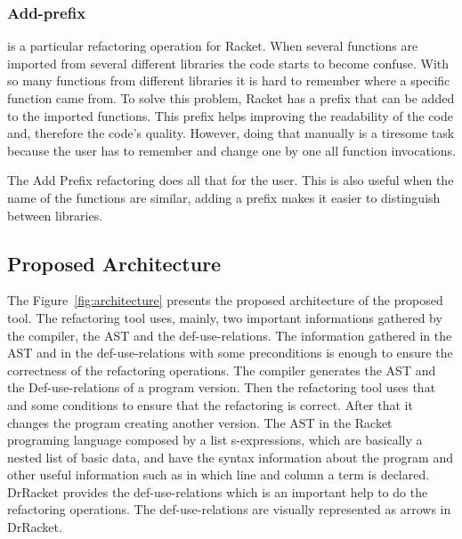 \subsubsection{Add-prefix}
is a particular refactoring operation for Racket.
When several functions are imported from several different libraries the code starts to become confuse.
With so many functions from different libraries it is hard to remember where a specific function came from.
To solve this problem, Racket has a prefix that can be added to the imported functions.
This prefix helps improving the readability of the code and, therefore the code's quality.
However, doing that manually is a tiresome task because the user has to remember and change one by one all function invocations.

The Add Prefix refactoring does all that for the user.
This is also useful when the name of the functions are similar, adding a prefix makes it easier to distinguish between libraries.





\subsection{Proposed Architecture}

The Figure~\ref{fig:architecture} presents the proposed architecture of the proposed tool. 
The refactoring tool uses, mainly, two important informations gathered by the compiler, the AST and the def-use-relations.
The information gathered in the AST and in the def-use-relations with some preconditions is enough to ensure the correctness of the refactoring operations.
The compiler generates the AST and the Def-use-relations of a program version. Then the refactoring tool uses that and some conditions to ensure that the refactoring is correct. After that it changes the program creating another version.
The AST in the Racket programing language composed by a list s-expressions, which are basically a nested list of basic data, and have the syntax information about the program and other useful information such as in which line and column a term is declared.
DrRacket provides the def-use-relations which is an important help to do the refactoring operations. The def-use-relations are visually represented as arrows in DrRacket.

